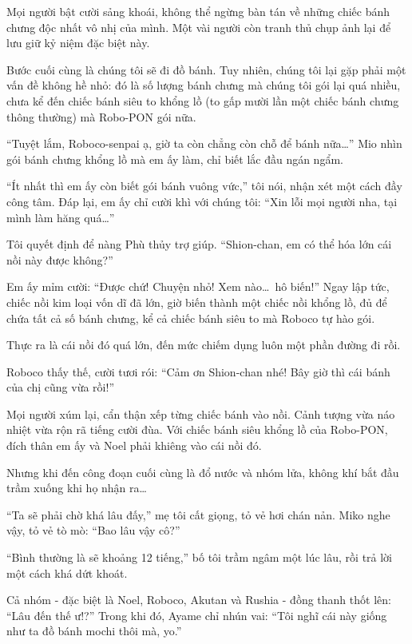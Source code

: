 \documentclass[../main.tex]{subfiles}
\begin{document}
Mọi người bật cười sảng khoái, không thể ngừng bàn tán về những chiếc bánh chưng độc nhất vô nhị của mình. Một vài người còn tranh thủ chụp ảnh lại để lưu giữ kỷ niệm đặc biệt này.

\ct

Bước cuối cùng là chúng tôi sẽ đi đồ bánh. Tuy nhiên, chúng tôi lại gặp phải một vấn đề không hề nhỏ: đó là số lượng bánh chưng mà chúng tôi gói lại quá nhiều, chưa kể đến chiếc bánh siêu to khổng lồ (to gấp mười lần một chiếc bánh chưng thông thường) mà Robo-PON gói nữa.

``Tuyệt lắm, Roboco-senpai ạ, giờ ta còn chẳng còn chỗ để bánh nữa\dots'' Mio nhìn gói bánh chưng khổng lồ mà em ấy làm, chỉ biết lắc đầu ngán ngẩm.

``Ít nhất thì em ấy còn biết gói bánh vuông vức,'' tôi nói, nhận xét một cách đầy công tâm. Đáp lại, em ấy chỉ cười khì với chúng tôi: ``Xin lỗi mọi người nha, tại mình làm hăng quá\dots''

Tôi quyết định để nàng Phù thủy trợ giúp. ``Shion-chan, em có thể hóa lớn cái nồi này được không?''

Em ấy mỉm cười: ``Được chứ! Chuyện nhỏ! Xem nào\dots\ hô biến!'' Ngay lập tức, chiếc nồi kim loại vốn dĩ đã lớn, giờ biến thành một chiếc nồi khổng lồ, đủ để chứa tất cả số bánh chưng, kể cả chiếc bánh siêu to mà Roboco tự hào gói.

Thực ra là cái nồi đó quá lớn, đến mức chiếm dụng luôn một phần đường đi rồi.


Roboco thấy thế, cười tươi rói: ``Cảm ơn Shion-chan nhé! Bây giờ thì cái bánh của chị cũng vừa rồi!''

Mọi người xúm lại, cẩn thận xếp từng chiếc bánh vào nồi. Cảnh tượng vừa náo nhiệt vừa rộn rã tiếng cười đùa. Với chiếc bánh siêu khổng lồ của Robo-PON, đích thân em ấy và Noel phải khiêng vào cái nồi đó.

Nhưng khi đến công đoạn cuối cùng là đổ nước và nhóm lửa, không khí bắt đầu trầm xuống khi họ nhận ra\dots

``Ta sẽ phải chờ khá lâu đấy,'' mẹ tôi cất giọng, tỏ vẻ hơi chán nản. Miko nghe vậy, tỏ vẻ tò mò: ``Bao lâu vậy cô?''

``Bình thường là sẽ khoảng 12 tiếng,'' bố tôi trầm ngâm một lúc lâu, rồi trả lời một cách khá dứt khoát.

Cả nhóm - đặc biệt là Noel, Roboco, Akutan và Rushia - đồng thanh thốt lên: ``Lâu đến thế ư!?'' Trong khi đó, Ayame chỉ nhún vai: ``Tôi nghĩ cái này giống như ta đồ bánh mochi thôi mà, yo.''
\end{document}
